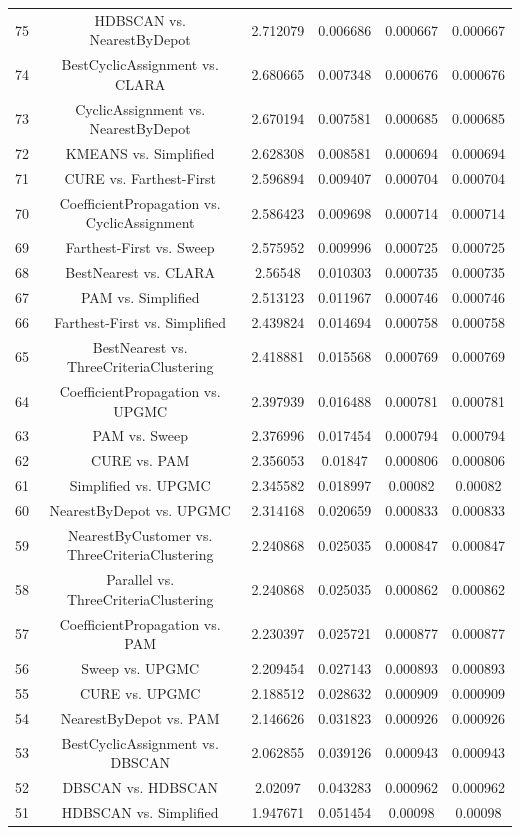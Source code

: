 \documentclass[a4paper,10pt]{article}
\begin{document}
\begin{landscape}
\begin{table}[!htp]
\begin{tabular}{cccccc}
75&HDBSCAN vs. NearestByDepot&2.712079&0.006686&0.000667&0.000667\\
74&BestCyclicAssignment vs. CLARA&2.680665&0.007348&0.000676&0.000676\\
73&CyclicAssignment vs. NearestByDepot&2.670194&0.007581&0.000685&0.000685\\
72&KMEANS vs. Simplified&2.628308&0.008581&0.000694&0.000694\\
71&CURE vs. Farthest-First&2.596894&0.009407&0.000704&0.000704\\
70&CoefficientPropagation vs. CyclicAssignment&2.586423&0.009698&0.000714&0.000714\\
69&Farthest-First vs. Sweep&2.575952&0.009996&0.000725&0.000725\\
68&BestNearest vs. CLARA&2.56548&0.010303&0.000735&0.000735\\
67&PAM vs. Simplified&2.513123&0.011967&0.000746&0.000746\\
66&Farthest-First vs. Simplified&2.439824&0.014694&0.000758&0.000758\\
65&BestNearest vs. ThreeCriteriaClustering&2.418881&0.015568&0.000769&0.000769\\
64&CoefficientPropagation vs. UPGMC&2.397939&0.016488&0.000781&0.000781\\
63&PAM vs. Sweep&2.376996&0.017454&0.000794&0.000794\\
62&CURE vs. PAM&2.356053&0.01847&0.000806&0.000806\\
61&Simplified vs. UPGMC&2.345582&0.018997&0.00082&0.00082\\
60&NearestByDepot vs. UPGMC&2.314168&0.020659&0.000833&0.000833\\
59&NearestByCustomer vs. ThreeCriteriaClustering&2.240868&0.025035&0.000847&0.000847\\
58&Parallel vs. ThreeCriteriaClustering&2.240868&0.025035&0.000862&0.000862\\
57&CoefficientPropagation vs. PAM&2.230397&0.025721&0.000877&0.000877\\
56&Sweep vs. UPGMC&2.209454&0.027143&0.000893&0.000893\\
55&CURE vs. UPGMC&2.188512&0.028632&0.000909&0.000909\\
54&NearestByDepot vs. PAM&2.146626&0.031823&0.000926&0.000926\\
53&BestCyclicAssignment vs. DBSCAN&2.062855&0.039126&0.000943&0.000943\\
52&DBSCAN vs. HDBSCAN&2.02097&0.043283&0.000962&0.000962\\
51&HDBSCAN vs. Simplified&1.947671&0.051454&0.00098&0.00098\\

\end{tabular}
\end{table}
\end{landscape}
\end{document}
